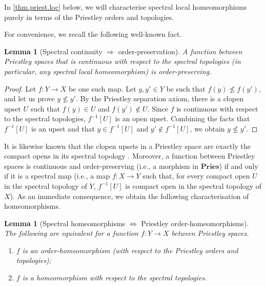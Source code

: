 \documentclass[12pt]{amsart}
\theoremstyle{plain}
\newtheorem{lemma}[theorem]{Lemma}
\theoremstyle{definition}
\newcommand{\cat}[1]{\mathbf{#1}}
\newcommand{\Pries}{\cat{Pries}}
\begin{document}
In \cref{thm.priest.loc} below, we will characterise spectral local homeomorphisms purely in terms of the Priestley orders and topologies.


For convenience, we recall the following well-known fact.


\begin{lemma}[Spectral continuity $\Rightarrow$ order-preservation]\label{monot.spectral}
    A function between Priestley spaces that is continuous with respect to the spectral topologies (in particular, any spectral local homeomorphism) is order-preserving.
\end{lemma}

\begin{proof}
    Let $f \colon Y \to X$ be one such map.
    Let $y,y' \in Y$ be such that $f(y) \nleq f(y')$, and let us prove $y \not\leq y'$.
    By the Priestley separation axiom, there is a clopen upset $U$ such that $f(y)\in U$ and $f(y')\not\in U$. 
    Since $f$ is continuous with respect to the spectral topologies, $f^{-1}[U]$ is an open upset. 
    Combining the facts that $f^{-1}[U]$ is an upset and that $y \in f^{-1}[U]$ and $y' \notin f^{-1}[U]$, we obtain $y \nleq y'$.
\end{proof}

It is likewise known that the clopen upsets in a Priestley space are exactly the compact opens in its spectral topology \cite[Lem.~2.1]{W1975}. Moreover, a function between Priestley spaces is continuous and order-preserving (i.e., a morphism in $\Pries$) if and only if it is a spectral map (i.e., a map $f \colon X \to Y$ such that, for every compact open $U$ in the spectral topology of $Y$, $f^{-1}[U]$ is compact open in the spectral topology of $X$). As an immediate consequence, we obtain the following characterisation of homeomorphisms.

\begin{lemma}[Spectral homeomorphisms $\Leftrightarrow$ Priestley order-homeomorphisms]\label{homeo.spectral}
    The following are equivalent for a function $f \colon Y \to X$ between Priestley spaces.
    \begin{enumerate}
    
        \item\label{homeo1} 
        $f$ is an order-homeomorphism (with respect to the Priestley orders and topologies);
        
        \item\label{homeo2}
        $f$ is a homeomorphism with respect to the spectral topologies.
        
    \end{enumerate}
\end{lemma}
\end{document}

